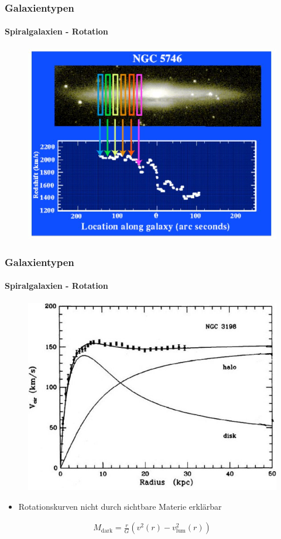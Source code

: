 \begin{frame}
\frametitle{Galaxientypen}
\framesubtitle{Spiralgalaxien - Rotation}

\begin{figure}[h]
	\includegraphics[scale=0.4]{Spiralgalaxie_Rotation1.jpg}
\end{figure}

\end{frame}




\begin{frame}
\frametitle{Galaxientypen}
\framesubtitle{Spiralgalaxien - Rotation}


\begin{figure}
	\includegraphics[scale=0.35]{Spiralgalaxie_Rotation2.jpg}
\end{figure}

\begin{itemize}
\item Rotationskurven nicht durch sichtbare Materie erklärbar
\end{itemize}


\begin{align*}
M_{\text{dark}} = \frac{r}{G} \left( v^2(r) - v_{\text{lum}}^2(r) \right)
\end{align*}

\end{frame}




